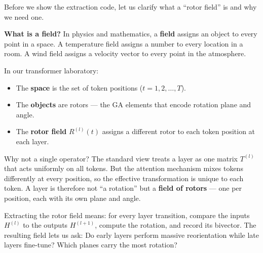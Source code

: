 \documentclass[11pt, twoside, openright]{memoir}
\numberwithin{equation}{chapter}
\begin{document}
Before we show the extraction code, let us clarify what a ``rotor
field'' is and why we need one.

\begin{keyidea}
\textbf{What is a field?}
In physics and mathematics, a \textbf{field} assigns an object to
every point in a space.  A temperature field assigns a number to every
location in a room.  A wind field assigns a velocity vector to every
point in the atmosphere.

In our transformer laboratory:
\begin{itemize}[nosep]
\item The \textbf{space} is the set of token positions
  ($t = 1, 2, \ldots, T$).
\item The \textbf{objects} are rotors --- the GA elements that encode
  rotation plane and angle.
\item The \textbf{rotor field} $R^{(l)}(t)$ assigns a different rotor
  to each token position at each layer.
\end{itemize}

Why not a single operator?  The standard view treats a layer as one
matrix $T^{(l)}$ that acts uniformly on all tokens.  But the attention
mechanism mixes tokens differently at every position, so the effective
transformation is unique to each token.  A layer is therefore not ``a
rotation'' but a \textbf{field of rotors} --- one per position, each
with its own plane and angle.

Extracting the rotor field means: for every layer transition,
compare the inputs $H^{(l)}$ to the outputs $H^{(l+1)}$, compute
the rotation, and record its bivector.  The resulting field lets
us ask: Do early layers perform massive reorientation while late
layers fine-tune?  Which planes carry the most rotation?
\end{keyidea}
\end{document}

